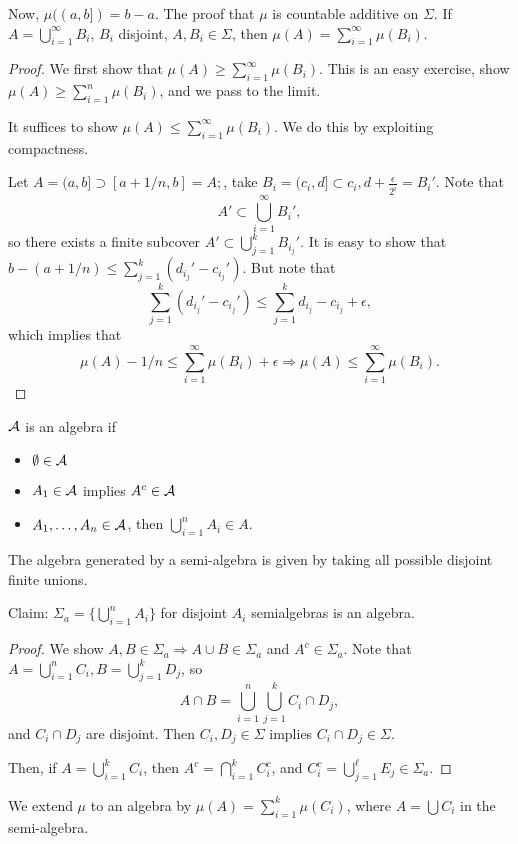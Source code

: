 \documentclass[11pt]{scrartcl}
\begin{document}
Now, $\mu((a, b]) = b-a$. The proof that $\mu$ is countable additive on $\Sigma$.  If $A = \bigcup_{i=1}^{\infty} B_i$, $B_i$ disjoint, $A, B_i \in \Sigma$, then $\mu(A) = \sum_{i=1}^{\infty} \mu(B_i).$
\begin{proof}
We first show that $\mu(A) \ge \sum_{i=1}^{\infty} \mu(B_i)$.  This is an easy exercise, show $\mu(A) \ge \sum_{i=1}^{n}\mu(B_i)$, and we pass to the limit.

It suffices to show $\mu(A) \le \sum_{i=1}^{\infty} \mu(B_i)$.  We do this by exploiting compactness.

Let $A = (a, b] \supset [a+1/n, b] = A;$, take $B_i = (c_i, d] \subset c_i, d + \frac{\epsilon}{2^i} = B_i'$.  Note that $$A' \subset \bigcup_{i=1}^{\infty}B_i',$$
so there exists a finite subcover $A' \subset \bigcup_{j=1}^{k} B_{i_j}'.$  It is easy to show that $b - (a+1/n) \le \sum_{j=1}^{k} (d_{i_j}' - c_{i_j}')$. But note that 
$$\sum_{j=1}^{k} (d_{i_j}' - c_{i_j}') \le \sum_{j=1}^k d_{i_j} - c_{i_j} + \epsilon,$$
which implies that $$\mu(A) - 1/n \le \sum_{i=1}^{\infty}\mu(B_i) + \epsilon \Rightarrow \mu(A) \le \sum_{i=1}^{\infty} \mu(B_i).$$ 
\end{proof}
\begin{definition} $\mathcal A$ is an algebra if 
\begin{itemize}
\item $\emptyset \in \mathcal A$
\item $A_1 \in \mathcal A$ implies $A^c \in \mathcal A$
\item $A_1, \dots, A_n \in \mathcal A$, then $\bigcup_{i=1}^n A_i \in A$.
\end{itemize}
The algebra generated by a semi-algebra is given by taking all possible disjoint finite unions.
\end{definition}
Claim: $\Sigma_a = \{\bigcup_{i=1}^n A_i\}$ for disjoint $A_i$ semialgebras is an algebra.
\begin{proof}
We show $A, B \in \Sigma_a \Rightarrow A\cup B \in \Sigma_a$ and $A^c \in \Sigma_a$.  
Note that $A = \bigcup_{i=1}^n C_i, B = \bigcup_{j=1}^k D_j$, so $$A \cap B = \bigcup_{i=1}^n \bigcup_{j=1}^k C_i \cap D_j,$$
and $C_i \cap D_j $ are disjoint.  Then $C_i, D_j \in \Sigma$ implies $C_i \cap D_j \in \Sigma$.

Then, if $A = \bigcup_{i=1}^k C_i$, then $A^c = \bigcap_{i=1}^k C_i^c$, and $C_i^c = \bigcup_{j=1}^\ell E_j \in \Sigma_a$.
\end{proof}

We extend $\mu$ to an algebra by $\mu(A) = \sum_{i=1}^k \mu(C_i)$, where $A = \bigcup C_i$ in the semi-algebra.
\pagebreak
\end{document}
